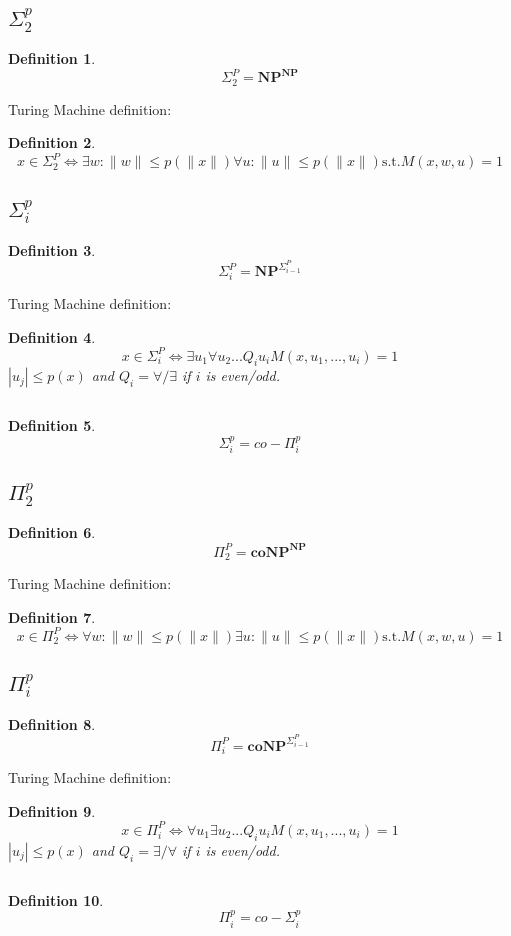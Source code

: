 \documentclass[]{article}
\theoremstyle{break}
\theoremstyle{break}
\newtheorem{definition}{Definition}[section]
\begin{document}
\subsection{$\Sigma^p_2$}
\label{sec:sigmap2}
\begin{definition}
	$$\Sigma_2^P = \hyperref[sec:NP]{\textbf{NP}^{\textbf{NP}}}$$
\end{definition}
$ $
\\
Turing Machine definition:
\begin{definition}
	$$x \in \Sigma_2^P\iff \exists w : \|w\| \leq p(\|x\|) \forall u : \|u\| \leq p(\|x\|)\text{s.t.} M(x, w,u) = 1$$
\end{definition}
\subsection{$\Sigma^p_i$}
\label{sec:sigmapi}
\begin{definition}
	$$\Sigma_i^P = \hyperref[sec:NP]{\textbf{NP}}^{\hyperref[sec:sigmapi]{\Sigma_{i-1}^P}}$$
\end{definition}
$ $
\\
Turing Machine definition:
\begin{definition}
	$$x \in \Sigma_i^P\iff \exists u_1\forall u_2 ... Q_i u_i M(x,u_1,...,u_i) = 1$$
	$|u_j| \leq p(x)$ and $Q_i=\forall/\exists$ if $i$ is even/odd.
\end{definition}
$ $
\\
\begin{definition}
	$$\Sigma_i^p ={\hyperref[sec:pipi]{co-\Pi_{i}^p}}$$
\end{definition}
\subsection{$\Pi^p_2$}
\label{sec:pip2}
\begin{definition}
	$$\Pi_2^P = \hyperref[sec:coNP]{\textbf{coNP}^{\textbf{NP}}}$$
\end{definition}
$ $
\\
Turing Machine definition:
\begin{definition}
	$$x \in \Pi_2^P\iff \forall w : \|w\| \leq p(\|x\|) \exists u : \|u\| \leq p(\|x\|)\text{s.t.} M(x, w,u) = 1$$
\end{definition}
\subsection{$\Pi^p_i$}
\label{sec:pipi}
\begin{definition}
	$$\Pi_i^P = \hyperref[sec:coNP]{\textbf{coNP}}^{\hyperref[sec:sigmapi]{\Sigma_{i-1}^P}}$$
\end{definition}
$ $
\\
Turing Machine definition:
\begin{definition}
	$$x \in \Pi_i^P\iff \forall u_1\exists u_2 ... Q_i u_i M(x,u_1,...,u_i) = 1$$
	$|u_j| \leq p(x)$ and $Q_i=\exists/\forall$ if $i$ is even/odd.
\end{definition}
$ $
\\
\begin{definition}
	$$\Pi_i^p ={\hyperref[sec:sigmapi]{co-\Sigma_{i}^p}}$$
\end{definition}
\end{document}
